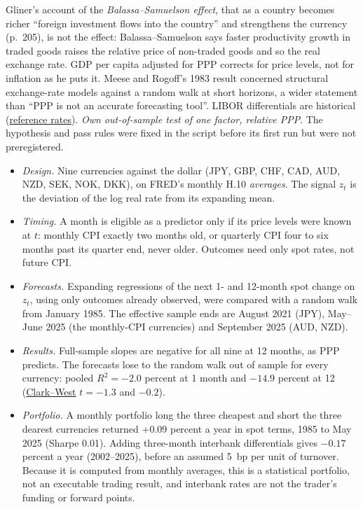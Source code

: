 \begin{qfmethod}
 Gliner's account of the \emph{Balassa--Samuelson effect}, that as a country becomes richer ``foreign investment flows into the country'' and strengthens the currency (p.~205), is not the effect: Balassa--Samuelson says faster productivity growth in traded goods raises the relative price of non-traded goods and so the real exchange rate. GDP per capita adjusted for PPP corrects for price levels, not for inflation as he puts it. Meese and Rogoff's 1983 result concerned structural exchange-rate models against a random walk at short horizons, a wider statement than ``PPP is not an accurate forecasting tool''. LIBOR differentials are historical (\hyperref[def:money-market-reference-rates]{reference rates}). \emph{Own out-of-sample test of one factor, relative PPP}. The hypothesis and pass rules were fixed in the script before its first run but were not preregistered.
\begin{itemize}
\item \emph{Design.} Nine currencies against the dollar (JPY, GBP, CHF, CAD, AUD, NZD, SEK, NOK, DKK), on FRED's monthly H.10 \emph{averages}. The signal $z_t$ is the deviation of the log real rate from its expanding mean.
\item \emph{Timing.} A month is eligible as a predictor only if its price levels were known at $t$: monthly CPI exactly two months old, or quarterly CPI four to six months past its quarter end, never older. Outcomes need only spot rates, not future CPI.
\item \emph{Forecasts.} Expanding regressions of the next 1- and 12-month spot change on $z_t$, using only outcomes already observed, were compared with a random walk from January 1985. The effective sample ends are August 2021 (JPY), May--June 2025 (the monthly-CPI currencies) and September 2025 (AUD, NZD).
\item \emph{Results.} Full-sample slopes are negative for all nine at 12 months, as PPP predicts. The forecasts lose to the random walk out of sample for every currency: pooled $R^2=-2.0$ percent at 1 month and $-14.9$ percent at 12 (\hyperref[meth:nested-forecast-tests]{Clark--West} $t=-1.3$ and $-0.2$).
\item \emph{Portfolio.} A monthly portfolio long the three cheapest and short the three dearest currencies returned $+0.09$ percent a year in spot terms, 1985 to May 2025 (Sharpe 0.01). Adding three-month interbank differentials gives $-0.17$ percent a year (2002--2025), before an assumed 5~bp per unit of turnover. Because it is computed from monthly averages, this is a statistical portfolio, not an executable trading result, and interbank rates are not the trader's funding or forward points.

\end{itemize}
\end{qfmethod}

